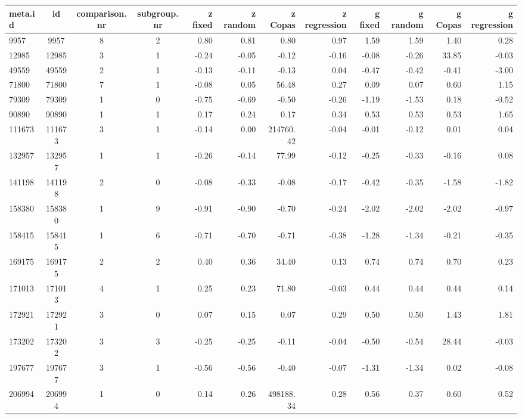 \documentclass[11pt,a4paper,twoside]{book}\usepackage[]{graphicx}\usepackage[]{color}
\begin{document}
\begin{table}[ht]
\centering
\begingroup\tiny
\begin{tabular}{lcccrrrrrrrr}
  \hline
meta.id & id & comparison.nr & subgroup.nr & z fixed & z random & z Copas & z regression & g fixed & g random & g Copas & g regression \\ 
  \hline
9957 & 9957 & 8 & 2 & 0.80 & 0.81 & 0.80 & 0.97 & 1.59 & 1.59 & 1.40 & 0.28 \\ 
  12985 & 12985 & 3 & 1 & -0.24 & -0.05 & -0.12 & -0.16 & -0.08 & -0.26 & 33.85 & -0.03 \\ 
  49559 & 49559 & 2 & 1 & -0.13 & -0.11 & -0.13 & 0.04 & -0.47 & -0.42 & -0.41 & -3.00 \\ 
  71800 & 71800 & 7 & 1 & -0.08 & 0.05 & 56.48 & 0.27 & 0.09 & 0.07 & 0.60 & 1.15 \\ 
  79309 & 79309 & 1 & 0 & -0.75 & -0.69 & -0.50 & -0.26 & -1.19 & -1.53 & 0.18 & -0.52 \\ 
  90890 & 90890 & 1 & 1 & 0.17 & 0.24 & 0.17 & 0.34 & 0.53 & 0.53 & 0.53 & 1.65 \\ 
  111673 & 111673 & 3 & 1 & -0.14 & 0.00 & 214760.42 & -0.04 & -0.01 & -0.12 & 0.01 & 0.04 \\ 
  132957 & 132957 & 1 & 1 & -0.26 & -0.14 & 77.99 & -0.12 & -0.25 & -0.33 & -0.16 & 0.08 \\ 
  141198 & 141198 & 2 & 0 & -0.08 & -0.33 & -0.08 & -0.17 & -0.42 & -0.35 & -1.58 & -1.82 \\ 
  158380 & 158380 & 1 & 9 & -0.91 & -0.90 & -0.70 & -0.24 & -2.02 & -2.02 & -2.02 & -0.97 \\ 
  158415 & 158415 & 1 & 6 & -0.71 & -0.70 & -0.71 & -0.38 & -1.28 & -1.34 & -0.21 & -0.35 \\ 
  169175 & 169175 & 2 & 2 & 0.40 & 0.36 & 34.40 & 0.13 & 0.74 & 0.74 & 0.70 & 0.23 \\ 
  171013 & 171013 & 4 & 1 & 0.25 & 0.23 & 71.80 & -0.03 & 0.44 & 0.44 & 0.44 & 0.14 \\ 
  172921 & 172921 & 3 & 0 & 0.07 & 0.15 & 0.07 & 0.29 & 0.50 & 0.50 & 1.43 & 1.81 \\ 
  173202 & 173202 & 3 & 3 & -0.25 & -0.25 & -0.11 & -0.04 & -0.50 & -0.54 & 28.44 & -0.03 \\ 
  197677 & 197677 & 3 & 1 & -0.56 & -0.56 & -0.40 & -0.07 & -1.31 & -1.34 & 0.02 & -0.08 \\ 
  206994 & 206994 & 1 & 0 & 0.14 & 0.26 & 498188.34 & 0.28 & 0.56 & 0.37 & 0.60 & 0.52 \\ 

\end{tabular}
\end{table}
\end{document}
